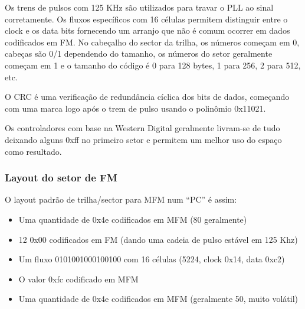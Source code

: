 \documentclass[letterpaper,10pt,brazil]{sphinxmanual}
\begin{document}
Os trens de pulsos com 125 KHz são utilizados para travar o PLL ao
sinal corretamente. Os fluxos específicos com 16 células permitem
distinguir entre o clock e os data bits fornecendo um arranjo que não é
comum ocorrer em dados codificados em FM. No cabeçalho do sector da
trilha, os números começam em 0, cabeças são 0/1 dependendo do tamanho,
os números do setor geralmente começam em 1 e o tamanho do código é 0
para 128 bytes, 1 para 256, 2 para 512, etc.

O CRC é uma verificação de redundância cíclica dos bits de dados,
começando com uma marca logo após o trem de pulso usando o polinômio
0x11021.

Os controladores com base na Western Digital geralmente livram-se de
tudo deixando alguns 0xff no primeiro setor e permitem um melhor uso do
espaço como resultado.


\subsubsection{Layout do setor de FM}
\label{techspecs/floppy:id2}
O layout padrão de trilha/sector para MFM num ``PC'' é assim:
\begin{itemize}
\item {} 
Uma quantidade de 0x4e codificados em MFM (80 geralmente)

\item {} 
12 0x00 codificados em FM (dando uma cadeia de pulso estável em
125 Khz)

\item {} 
Um fluxo 0101001000100100 com 16 células (5224, clock 0x14, data 0xc2)

\item {} 
O valor 0xfc codificado em MFM

\item {} 
Uma quantidade de 0x4e codificados em MFM (geralmente 50, muito
volátil)

\end{itemize}
\end{document}
